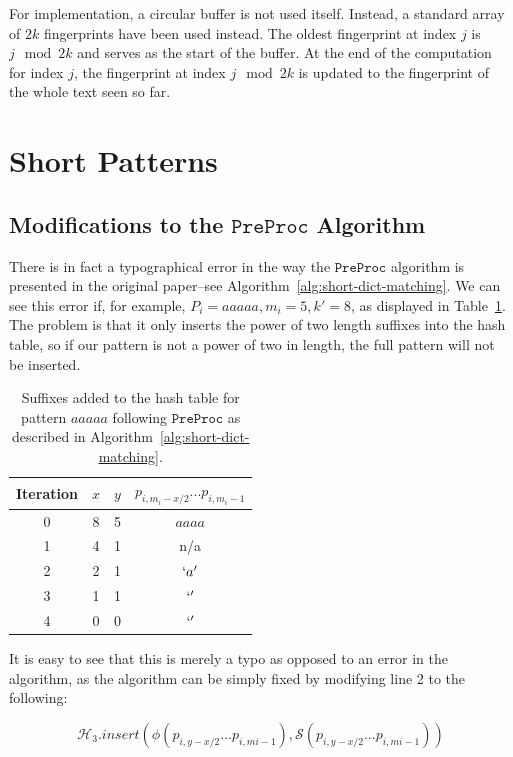 \documentclass[ %
                    author={Dominic Joseph Moylett},
                    degree={MEng},
                     title={Dictionary Matching with Fingerprints},
                  subtitle={An Empirical Analysis},
                      type={Research},
                      year={2014} ]{dissertation}
\begin{document}
For implementation, a circular buffer is not used itself. Instead, a standard array of $2k$ fingerprints have been used instead. The oldest fingerprint at index $j$ is $j \mod 2k$ and serves as the start of the buffer. At the end of the computation for index $j$, the fingerprint at index $j \mod 2k$ is updated to the fingerprint of the whole text seen so far.

\section{Short Patterns}
\label{sec:impl-short}

\subsection{Modifications to the $\texttt{PreProc}$ Algorithm}

There is in fact a typographical error in the way the $\texttt{PreProc}$ algorithm is presented in the original paper--see Algorithm~\ref{alg:short-dict-matching}. We can see this error if, for example, $P_i = aaaaa, m_i = 5, k' = 8$, as displayed in Table~\ref{tab:preproc-results-incorrect}. The problem is that it only inserts the power of two length suffixes into the hash table, so if our pattern is not a power of two in length, the full pattern will not be inserted.

\begin{table}[t]
  \centering
  \begin{tabular}{|c|c|c|c|}
    \hline
    Iteration & $x$ & $y$ & $p_{i, m_i-x/2}...p_{i, m_i - 1}$ \\\hline
    0 & 8 & 5 & $aaaa$ \\\hline
    1 & 4 & 1 & n/a \\\hline
    2 & 2 & 1 & $`a'$ \\\hline
    3 & 1 & 1 & $`'$ \\\hline
    4 & 0 & 0 & $`'$ \\\hline
  \end{tabular}
  \caption{Suffixes added to the hash table for pattern $aaaaa$ following $\texttt{PreProc}$ as described in Algorithm~\ref{alg:short-dict-matching}.}
  \label{tab:preproc-results-incorrect}
\end{table}

It is easy to see that this is merely a typo as opposed to an error in the algorithm, as the algorithm can be simply fixed by modifying line 2 to the following:

$$\mathcal{H}_3.insert(\phi(p_{i, y - x/2}...p_{i, m{i} - 1}), \mathcal{S}(p_{i, y - x/2}...p_{i, m{i} - 1}))$$
\end{document}
